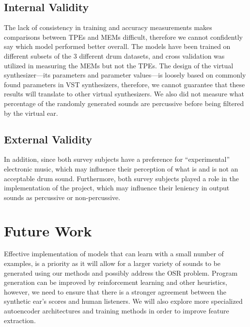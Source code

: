 \documentclass[\main/thesis.tex]{subfiles}
\begin{document}
\subsection{Internal Validity}
 The lack of consistency in training and accuracy measurements makes comparisons between TPEs and MEMs difficult, therefore we cannot confidently say which model performed better overall. The models have been trained on different subsets of the 3 different drum datasets, and cross validation was utilized in measuring the MEMs but not the TPEs. The design of the virtual synthesizer---its parameters and parameter values---is loosely based on commonly found parameters in VST synthesizers, therefore, we cannot guarantee that these results will translate to other virtual synthesizers. We also did not measure what percentage of the randomly generated sounds are percussive before being filtered by the virtual ear. 
\subsection{External Validity}
 In addition, since both survey subjects have a preference for \enquote{experimental} electronic music, which may influence their perception of what is and is not an acceptable drum sound. Furthermore, both survey subjects played a role in the implementation of the project, which may influence their leniency in output sounds as percussive or non-percussive. 

  
\section{Future Work} Effective implementation of models that can learn with a small number of examples, is a priority as it will allow for a larger variety of sounds to be generated using our methods and possibly address the OSR problem. Program generation can be improved by reinforcement learning and other heuristics, however, we need to ensure that there is a stronger agreement between the synthetic ear's scores and human listeners. We will also explore more specialized autoencoder architectures and training methods in order to improve feature extraction.
\end{document}
